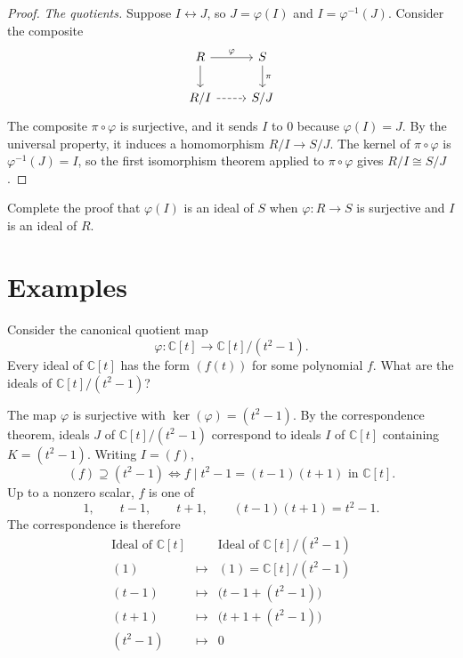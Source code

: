 \documentclass[reqno,11pt]{amsart}
\newcommand{\C}{\mathbb{C}}
\begin{document}
\begin{proof}
\emph{The quotients.}
Suppose $I\leftrightarrow J$, so $J=\varphi(I)$ and
$I=\varphi^{-1}(J)$. Consider the composite
\[
  \begin{tikzcd}
    R \arrow[r,"\varphi"] \arrow[d] & S \arrow[d,"\pi"]\\
    R/I \arrow[r,dashed] & S/J
  \end{tikzcd}
\]
The composite $\pi\circ\varphi$ is surjective, and it sends $I$ to
$0$ because $\varphi(I)=J$. By the universal property, it induces a
homomorphism $R/I\to S/J$. The kernel of $\pi\circ\varphi$ is
$\varphi^{-1}(J)=I$, so the first isomorphism theorem applied to
$\pi\circ\varphi$ gives $R/I\cong S/J$.
\end{proof}

\begin{exercise}
Complete the proof that $\varphi(I)$ is an ideal of $S$ when
$\varphi:R\to S$ is surjective and $I$ is an ideal of $R$.
\end{exercise}

\section{Examples}

\begin{example}[Ideals of $\C{[t]}/(t^2-1)$]
Consider the canonical quotient map
\[
  \varphi:\C[t]\to\C[t]/(t^2-1).
\]
Every ideal of $\C[t]$ has the form $(f(t))$ for some polynomial $f$.
What are the ideals of $\C[t]/(t^2-1)$?

The map $\varphi$ is surjective with $\ker(\varphi)=(t^2-1)$.
By the correspondence theorem, ideals $J$ of $\C[t]/(t^2-1)$
correspond to ideals $I$ of $\C[t]$ containing $K=(t^2-1)$.
Writing $I=(f)$,
\[
  (f)\supseteq(t^2-1)
  \iff f\mid t^2-1=(t-1)(t+1)\text{ in }\C[t].
\]
Up to a nonzero scalar, $f$ is one of
\[
  1,\qquad t-1,\qquad t+1,\qquad (t-1)(t+1)=t^2-1.
\]
The correspondence is therefore
\[
\begin{array}{ccl}
  \text{Ideal of }\C[t] & & \text{Ideal of }\C[t]/(t^2-1)\\ \hline
  (1) & \longmapsto & (1)=\C[t]/(t^2-1)\\
  (t-1) & \longmapsto & \bigl(t-1+(t^2-1)\bigr)\\
  (t+1) & \longmapsto & \bigl(t+1+(t^2-1)\bigr)\\
  (t^2-1) & \longmapsto & 0
\end{array}
\]
\end{example}
\end{document}
